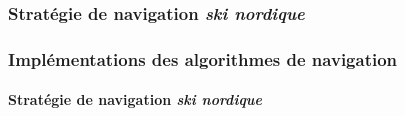 \documentclass{beamer}
\begin{document}
			\subsubsection*{Stratégie de navigation \textit{ski nordique}}
				\begin{frame}
					\frametitle{Implémentations des algorithmes de navigation}
					\framesubtitle{Stratégie de navigation \textit{ski nordique}}
					\begin{figure}[H]
						\centering
					\end{figure}
				\end{frame}
\end{document}
